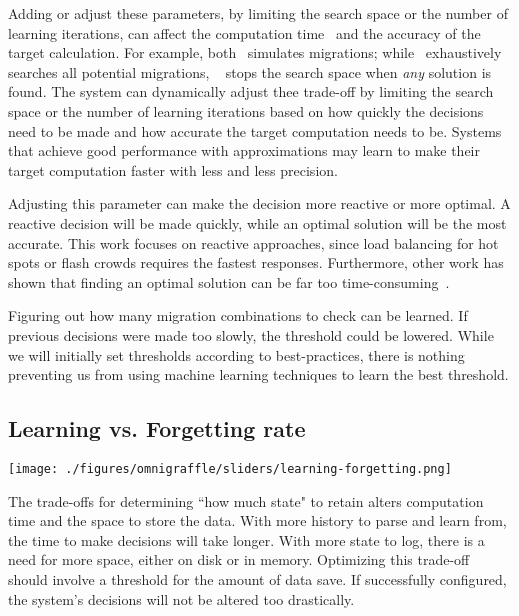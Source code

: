 Adding or adjust these parameters, by limiting the search space or the number of learning iterations, can affect the computation time~\cite{strong:2014techreport-jack, behzad:techreport2014-io-autotuning} and the accuracy of the target calculation. For example, both~\cite{vmware-drs, xen-wlb} simulates migrations; while~\cite{vmware-drs} exhaustively searches all potential migrations, ~\cite{xen-wlb} stops the search space when {\it any} solution is found.  The system can dynamically adjust thee trade-off by limiting the search space or the number of learning iterations based on how quickly the decisions need to be made and how accurate the target computation needs to be.  Systems that achieve good performance with approximations may learn to make their target computation faster with less and less precision. 

Adjusting this parameter can make the decision more reactive or more optimal. A reactive decision will be made quickly, while an optimal solution will be the most accurate. This work focuses on reactive approaches, since load balancing for hot spots or flash crowds requires the fastest responses. Furthermore, other work has shown that finding an optimal solution can be far too time-consuming~\cite{strong:2014techreport-jack,behzad:techreport2014-io-autotuning}. 

Figuring out how many migration combinations to check can be learned. If previous decisions were made too slowly, the threshold could be lowered. While we will initially set thresholds according to best-practices, there is nothing preventing us from using machine learning techniques to learn the best threshold.

\subsection{Learning vs. Forgetting rate}
\begin{minipage}{0.8\textwidth}
	\texttt{[image: ./figures/omnigraffle/sliders/learning-forgetting.png]} 
	\vspace{0.2in}
\end{minipage}

The trade-offs for determining ``how much state" to retain alters computation time and the space to store the data. With more history to parse and learn from, the time to make decisions will take longer. With more state to log, there is a need for more space, either on disk or in memory. Optimizing this trade-off should involve a threshold for the amount of data save. If successfully configured, the system's decisions will not be altered too drastically. 

